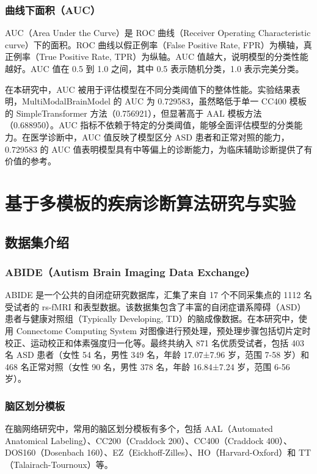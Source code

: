 \documentclass[12pt,a4paper]{article}
\begin{document}
\subsubsection{曲线下面积（AUC）}

AUC（Area Under the Curve）是 ROC 曲线（Receiver Operating Characteristic curve）下的面积。ROC 曲线以假正例率（False Positive Rate, FPR）为横轴，真正例率（True Positive Rate, TPR）为纵轴。AUC 值越大，说明模型的分类性能越好。AUC 值在 0.5 到 1.0 之间，其中 0.5 表示随机分类，1.0 表示完美分类。

在本研究中，AUC 被用于评估模型在不同分类阈值下的整体性能。实验结果表明，MultiModalBrainModel 的 AUC 为 0.729583，虽然略低于单一 CC400 模板的 SimpleTransformer 方法（0.756921），但显著高于 AAL 模板方法（0.688950）。AUC 指标不依赖于特定的分类阈值，能够全面评估模型的分类能力。在医学诊断中，AUC 值反映了模型区分 ASD 患者和正常对照的能力，0.729583 的 AUC 值表明模型具有中等偏上的诊断能力，为临床辅助诊断提供了有价值的参考。

\section{基于多模板的疾病诊断算法研究与实验}

\subsection{数据集介绍}

\subsubsection{ABIDE（Autism Brain Imaging Data Exchange）}

ABIDE 是一个公共的自闭症研究数据库\cite{dimartino2014autism}，汇集了来自 17 个不同采集点的 1112 名受试者的 rs-fMRI 和表型数据。该数据集包含了丰富的自闭症谱系障碍（ASD）患者与健康对照组（Typically Developing, TD）的脑成像数据。在本研究中，使用 Connectome Computing System 对图像进行预处理，预处理步骤包括切片定时校正、运动校正和体素强度归一化等。最终共纳入 871 名优质受试者，包括 403 名 ASD 患者（女性 54 名，男性 349 名，年龄 17.07±7.96 岁，范围 7-58 岁）和 468 名正常对照（女性 90 名，男性 378 名，年龄 16.84±7.24 岁，范围 6-56 岁）。

\subsubsection{脑区划分模板}

在脑网络研究中，常用的脑区划分模板有多个，包括 AAL（Automated Anatomical Labeling）、CC200（Craddock 200）、CC400（Craddock 400）、DOS160（Dosenbach 160）、EZ（Eickhoff-Zilles）、HO（Harvard-Oxford）和 TT（Talairach-Tournoux）等。
\end{document}
